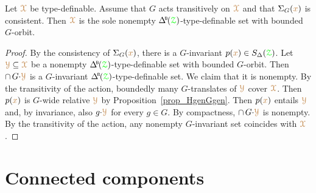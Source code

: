 \begin{proposition}\label{prop_HgenGgen}
  Let ${\color{brown}\EuScript X}$ be type-definable.
  Assume that $G$ acts transitively on ${\color{brown}\EuScript X}$ and that $\Sigma_G({\color{brown} x})$ is consistent.
  Then ${\color{brown}\EuScript X}$ is the sole nonempty $\BDelta(\grZ)$-type-definable set with bounded $G$-orbit.
\end{proposition}
\begin{proof}
  By the consistency of $\Sigma_G({\color{brown} x})$, there is a $G$-invariant $p({\color{brown} x})\in S_\Delta({\color{green}\EuScript Z})$.
  Let ${\color{brown}\EuScript Y}\subseteq{\color{brown}\EuScript X}$ be a nonempty $\BDelta(\grZ)$-type-definable set with bounded $G$-orbit.
  Then $\cap\,G{\cdot}{\color{brown}\EuScript Y}$ is a $G$-invariant $\BDelta(\grZ)$-type-definable set.
  We claim that it is nonempty.
  By the transitivity of the action, boundedly many $G$-translates of ${\color{brown}\EuScript Y}$ cover ${\color{brown}\EuScript X}$.
  Then $p({\color{brown} x})$ is $G$-wide relative ${\color{brown}\EuScript Y}$ by Proposition~\ref{prop_HgenGgen}.
  Then $p({\color{brown} x})$ entails ${\color{brown}\EuScript Y}$ and, by invariance, also $g{\cdot}{\color{brown}\EuScript Y}$ for every $g\in G$.
  By compactness, $\cap\,G{\cdot}{\color{brown}\EuScript Y}$ is nonempty.
  By the transitivity of the action, any nonempty $G$-invariant set coincides with ${\color{brown}\EuScript X}$. 
\end{proof}


  

\section{Connected components}\label{G0}
\def\medrel#1{\parbox[t]{5ex}{$\displaystyle\hfil #1$}}
\def\ceq#1#2#3{\parbox[t]{12ex}{$\displaystyle #1$}\medrel{#2}{$\displaystyle #3$}}

